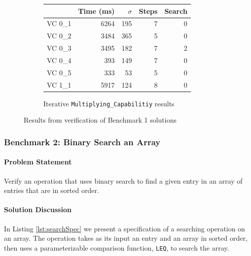 \begin{figure}
	\vspace{2em}
	\begin{subfigure}[b]{0.6\textwidth}
		\centering
		\begin{tabular}{lrrrr}
			\toprule
				& Time (ms)	& $\sigma$& Steps & Search \\
			\midrule
			VC 0\_1	& 6264		& 195	& 7	& 0     \\
			VC 0\_2	& 3484		& 365	& 5	& 0     \\
			VC 0\_3	& 3495		& 182	& 7	& 2     \\
			VC 0\_4	& 393		& 149	& 7	& 0     \\
			VC 0\_5	& 333		& 53	& 5	& 0     \\
			VC 1\_1	& 5917		& 124	& 8	& 0     \\
			\bottomrule
		\end{tabular}
		\caption{Iterative \texttt{Multiplying\_Capabilitiy} results\label{fig:iterMultResults}}
	\end{subfigure}
  \caption{Results from verification of Benchmark 1 solutions\label{fig:addMultResults}}
\end{figure}

\FloatBarrier
		\subsubsection{Benchmark 2: Binary Search an Array}

\paragraph{Problem Statement}Verify an operation that uses binary search to find a given entry in an array of entries that are in sorted order.

\paragraph{Solution Discussion}In Listing \ref{lst:searchSpec} we present a specification of a searching operation on an array.  The operation takes as its input an entry and an array in sorted order, then uses a parameterizable comparison function, \texttt{LEQ}, to search the array.



